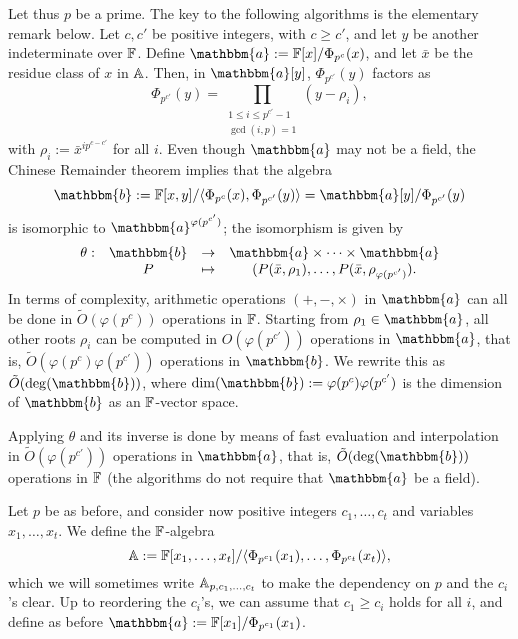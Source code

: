 Let thus $p$ be a prime. The key to the following algorithms is the
elementary remark below.  Let $c,c'$ be positive integers, with $c \ge
c'$, and let $y$ be another indeterminate over $\mathbb{F}$. Define
$\mathbbm{a}:=\F[x]/\Phi_{p^c}(x)$, and let $\bar x$ be the residue class of
$x$ in $\mathbb{A}$. Then, in $\mathbbm{a}[y]$, $\Phi_{p^{c'}}(y)$ factors as
$$\Phi_{p^{c'}}(y) =\prod_{\substack{1 \le i\le p^{c'}-1\\ \gcd(i,p) =1}}
(y-\rho_i),$$ with $\rho_i:={\bar x}^{i p^{c-c'}}$ for all $i$.  Even
though $\mathbbm{a}$ may not be a field, the Chinese Remainder theorem
implies that the algebra
$$\mathbbm{b}:=\F[x,y]/\langle \Phi_{p^c}(x), \Phi_{p^{c'}}(y)\rangle = \mathbbm{a}[y]/\Phi_{p^{c'}}(y)$$
is isomorphic to $\mathbbm{a}^{\varphi(p^{c'})}$;
the isomorphism is given by
$$\begin{array}{cccc}
\theta: & \mathbbm{b} & \to & \mathbbm{a} \times \cdots \times \mathbbm{a} \\
        & P & \mapsto& (P(\bar x,\rho_1),\dots,P(\bar x,\rho_{\varphi(p^{c'})}).
\end{array}$$
In terms of complexity, arithmetic operations $(+,-,\times)$ in $\mathbbm{a}$
can all be done in $\tilde{O}(\varphi(p^c))$ operations in $\mathbb{F}$.
Starting from $\rho_1 \in \mathbbm{a}$, all other roots $\rho_i$ can be
computed in $O(\varphi(p^{c'}))$ operations in $\mathbbm{a}$, that is,
$\tilde{O}(\varphi(p^c) \varphi(p^{c'}))$ operations in $\mathbbm{b}$.  We
rewrite this as $\tilde{O}(\deg(\mathbbm{b}))$, where $\dim(\mathbbm{b}):=\varphi(p^c)
\varphi(p^{c'})$ is the dimension of $\mathbbm{b}$ as an $\mathbb{F}$-vector space.

Applying $\theta$ and its inverse is done by means of fast evaluation
and interpolation~\cite[Chapter~10]{vzGathen13} in $\tilde{O}(\varphi(p^{c'}))$
operations in $\mathbbm{a}$, that is, $\tilde{O}(\deg(\mathbbm{b}))$ operations in $\mathbb{F}$
(the algorithms do not require that $\mathbbm{a}$ be a field).

\smallskip{}
Let $p$ be as before, and consider now positive integers
$c_1,\dots,c_t$ and variables $x_1,\dots,x_t$. We define the
$\mathbb{F}$-algebra
$$\mathbb{A}:=\mathbb{F}[x_1,\dots,x_t]/\langle \Phi_{p^{c_1}}(x_1), \dots,
\Phi_{p^{c_t}}(x_t)\rangle,$$ which we will sometimes write
$\mathbb{A}_{p,c_1,\dots,c_t}$ to make the dependency on $p$ and the $c_i$'s
clear. Up to reordering the $c_i$'s, we can assume that $c_1 \ge c_i$
holds for all $i$, and define as before
$\mathbbm{a}:=\F[x_1]/\Phi_{p^{c_1}}(x_1)$.

